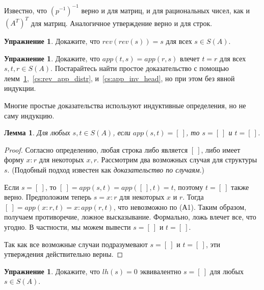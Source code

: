 \documentclass[12pt,notitlepage]{article}
\theoremstyle{plain}
\newtheorem{lemma}[thm]{Лемма}
\theoremstyle{definition}
\newtheorem{exc}[thm]{Упражнение}
\theoremstyle{plain}
\newcommand{\1}{\mathbf{1}}
\newcommand{\0}{\mathbf{0}}
\begin{document}
Известно, что $(p^{-1})^{-1}$ верно и для матриц, и для рациональных чисел, как и $(A^T)^T$ для матриц. Аналогичное утверждение верно и для строк.
\begin{exc}\label{cs:rev_involutive}
	Докажите, что $rev(rev(s)) = s$ для всех $s \in S(A)$.
\end{exc}

\begin{exc}
	Докажите, что $app(t,s) = app(r,s)$ влечет $t = r$ для всех $s, t, r \in S(A)$. Постарайтесь найти простое доказательство с помощью лемм~\ref{cs:rev_involutive},~\ref{cs:rev_app_distr}, и~\ref{cs:app_inv_head}, но при этом без явной индукции.
\end{exc}

Многие простые доказательства используют индуктивные определения, но не саму индукцию.
\begin{lemma}\label{cs:app_eq_nil}
	Для любых $s,t \in S(A)$, если $app(s,t) = [\ ]$, то $s = [\ ]$ и $t = [\ ]$.
\end{lemma}
\begin{proof}
	Согласно определению, любая строка либо является $[\ ]$, либо имеет форму $x : r$ для некоторых $x, r$. Рассмотрим два возможных случая для структуры $s$. (Подобный подход известен как \emph{доказательство по случаям}.)
	
	Если $s = [\ ]$, то $[\ ] = app(s,t) = app([\ ], t) = t$, поэтому $t = [\ ]$ также верно. Предположим теперь $s = x : r$ для некоторых $x$ и $r$. Тогда $[\ ] = app(x:r, t) = x : app(r, t)$, что невозможно по (А1). Таким образом, получаем противоречие, ложное высказывание. Формально, ложь влечет все, что угодно. В частности, мы можем вывести $s = [\ ]$ и $t = [\ ]$.
	
	Так как все возможные случаи подразумевают $s = [\ ]$ и $t = [\ ]$, эти утверждения действительно верны.
\end{proof}

\begin{exc}
	Докажите, что $lh(s) = 0$ эквивалентно  $s = [\ ]$ для любых $s \in S(A)$.
\end{exc}
\end{document}
